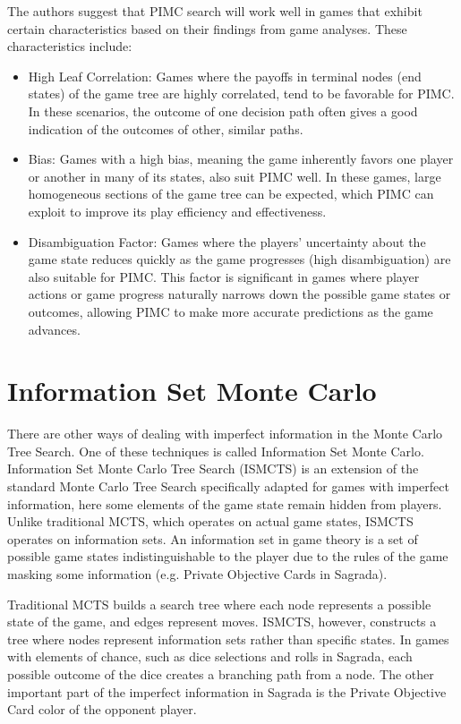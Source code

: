 The authors suggest that PIMC search will work well in games that exhibit certain characteristics based on their findings 
from game analyses. These characteristics include:
\begin{itemize}
    \item High Leaf Correlation: Games where the payoffs in terminal nodes (end states) of the game tree are highly correlated, tend to be favorable for PIMC. 
    In these scenarios, the outcome of one decision path often gives a good indication of the outcomes of other, similar paths.
    \item Bias: Games with a high bias, meaning the game inherently favors one player or another in many of its states, also suit PIMC well. In these games, 
    large homogeneous sections of the game tree can be expected, which PIMC can exploit to improve its play efficiency and effectiveness.
    \item Disambiguation Factor: Games where the players' uncertainty about the game state reduces quickly as the game progresses (high disambiguation) 
    are also suitable for PIMC. This factor is significant in games where player actions or game progress naturally narrows down the possible game states or outcomes, 
    allowing PIMC to make more accurate predictions as the game advances.
\end{itemize}

\section{Information Set Monte Carlo}

There are other ways of dealing with imperfect information in the Monte Carlo Tree Search. One of these techniques is called Information Set Monte Carlo.
Information Set Monte Carlo Tree Search (ISMCTS) is an extension of the standard Monte Carlo Tree Search specifically adapted for games with imperfect information, 
here some elements of the game state remain hidden from players. Unlike traditional MCTS, which operates on actual game states, ISMCTS operates on information sets. 
An information set in game theory is a set of possible game states indistinguishable to the player due to the rules of the game masking some information 
(e.g. Private Objective Cards in Sagrada).

Traditional MCTS builds a search tree where each node represents a possible state of the game, and edges represent moves. ISMCTS, however, constructs a tree where nodes 
represent information sets rather than specific states. In games with elements of chance, such as dice selections and rolls in Sagrada, each possible outcome of the dice creates 
a branching path from a node. The other important part of the imperfect information in Sagrada is the Private Objective Card color of the opponent player. 

